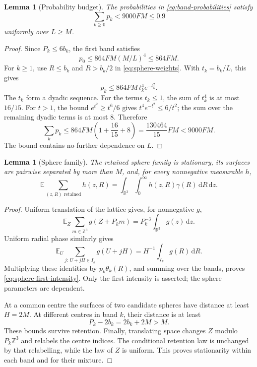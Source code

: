 \documentclass[11pt,a4paper]{article}
\numberwithin{equation}{section}
\newtheorem{lemma}[theorem]{Lemma}
\theoremstyle{definition}
\theoremstyle{remark}
\newcommand{\R}{\mathbb R}
\newcommand{\E}{\mathbb E}
\newcommand{\dd}{\,\mathrm d}
\begin{document}
\begin{lemma}[Probability budget]\label{lem:budget}
The probabilities in \eqref{eq:band-probabilities} satisfy
\[
 \sum_{k\geq0}p_k<9000FM\leq0.9
\]
uniformly over $L\geq M$.
\end{lemma}
\begin{proof}
Since $P_k\leq6b_k$, the first band satisfies
\[
 p_0\leq864FM(M/L)^4\leq864FM.
\]
For $k\geq1$, use $R\leq b_k$ and $R>b_k/2$ in
\eqref{eq:sphere-weights}. With $t_k=b_k/L$, this gives
\[
 p_k\leq864FM\,t_k^4e^{-t_k^2}.
\]
The $t_k$ form a dyadic sequence. For the terms $t_k\leq1$, the sum of
$t_k^4$ is at most $16/15$. For $t>1$, the bound
$e^{t^2}\geq t^6/6$ gives $t^4e^{-t^2}\leq6/t^2$; the sum over the
remaining dyadic terms is at most $8$. Therefore
\[
 \sum_kp_k\leq864FM\left(1+\frac{16}{15}+8\right)
 =\frac{130464}{15}FM<9000FM.
\]
The bound contains no further dependence on $L$.
\end{proof}

\begin{lemma}[Sphere family]\label{lem:sphere-family}
The retained sphere family is stationary, its surfaces are pairwise
separated by more than $M$, and, for every nonnegative measurable $h$,
\begin{equation}
 \E\sum_{(z,R)\text{ retained}}h(z,R)
 =\int_{\R^3}\int_0^\infty h(z,R)\gamma(R)\dd R\dd z.
 \label{eq:sphere-first-intensity}
\end{equation}
\end{lemma}
\begin{proof}
Uniform translation of the lattice gives, for nonnegative $g$,
\[
 \E_Z\sum_{m\in\mathbb Z^3}g(Z+P_km)=P_k^{-3}\int_{\R^3}g(z)\dd z.
\]
Uniform radial phase similarly gives
\[
 \E_U\sum_{j:\,U+jH\in I_k}g(U+jH)
 =H^{-1}\int_{I_k}g(R)\dd R.
\]
Multiplying these identities by $p_k\theta_k(R)$, and summing over the
bands, proves \eqref{eq:sphere-first-intensity}. Only the first intensity
is asserted; the sphere parameters are dependent.

At a common centre the surfaces of two candidate spheres have distance
at least $H=2M$. At different centres in band $k$, their distance is at
least
\begin{equation}
 P_k-2b_k=2b_k+2M>M.
 \label{eq:surface-gap}
\end{equation}
These bounds survive retention. Finally, translating space changes $Z$
modulo $P_k\mathbb Z^3$ and relabels the centre indices. The conditional
retention law is unchanged by that relabelling, while the law of $Z$ is
uniform. This proves stationarity within each band and for their mixture.
\end{proof}
\end{document}
